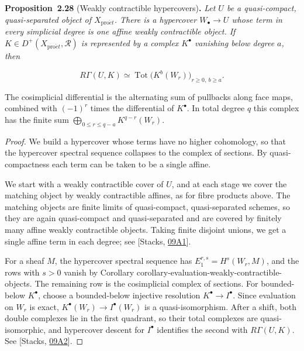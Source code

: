 \documentclass[11pt]{article}
\newenvironment{bpstatement}[2]{\par\addvspace{0.6\baselineskip}\noindent\textbf{#1}#2\textbf{.}\enspace\ignorespaces}
  {\par\addvspace{0.4\baselineskip}}
\newenvironment{bpstatementit}[2]{\begin{bpstatement}{#1}{#2}\itshape\ignorespaces}{\end{bpstatement}}
\begin{document}
\label{bp83}%
\begin{bpstatementit}{Proposition~2.28}{ (Weakly contractible hypercovers)}
Let \(U\) be a quasi-compact, quasi-separated object of \(X_{\mathrm{pro}\acute{e}t}\). There is a hypercover \(W_\bullet\to U\) whose term in every simplicial degree is one affine weakly contractible object. If \(K\in D^+(X_{\mathrm{pro}\acute{e}t},\mathcal R)\) is represented by a complex \(K^\bullet\) vanishing below degree \(a\), then

\[
R\Gamma(U,K)
\simeq \operatorname{Tot}\bigl(K^b(W_r)\bigr)_{r\geq0,\ b\geq a}.
\tag{2.3}
\]

The cosimplicial differential is the alternating sum of pullbacks along face maps, combined with \((-1)^r\) times the differential of \(K^\bullet\). In total degree \(q\) this complex has the finite sum \(\bigoplus_{0\leq r\leq q-a}K^{q-r}(W_r)\).
\end{bpstatementit}

\begin{proof}[{Proof}]\label{bp84}%
We build a hypercover whose terms have no higher cohomology, so that the hypercover spectral sequence collapses to the complex of sections. By quasi-compactness each term can be taken to be a single affine.

We start with a weakly contractible cover of \(U\), and at each stage we cover the matching object by weakly contractible affines, as for fibre products above. The matching objects are finite limits of quasi-compact, quasi-separated schemes, so they are again quasi-compact and quasi-separated and are covered by finitely many affine weakly contractible objects. Taking finite disjoint unions, we get a single affine term in each degree; see [Stacks, \href{https://stacks.math.columbia.edu/tag/09A1}{09A1}].

For a sheaf \(M\), the hypercover spectral sequence has \(E_1^{r,s}=H^s(W_r,M)\), and the rows with \(s>0\) vanish by Corollary corollary-evaluation-weakly-contractible-objects. The remaining row is the cosimplicial complex of sections. For bounded-below \(K^\bullet\), choose a bounded-below injective resolution \(K^\bullet\to I^\bullet\). Since evaluation on \(W_r\) is exact, \(K^\bullet(W_r)\to I^\bullet(W_r)\) is a quasi-isomorphism. After a shift, both double complexes lie in the first quadrant, so their total complexes are quasi-isomorphic, and hypercover descent for \(I^\bullet\) identifies the second with \(R\Gamma(U,K)\). See [Stacks, \href{https://stacks.math.columbia.edu/tag/09A2}{09A2}].
\end{proof}
\end{document}
